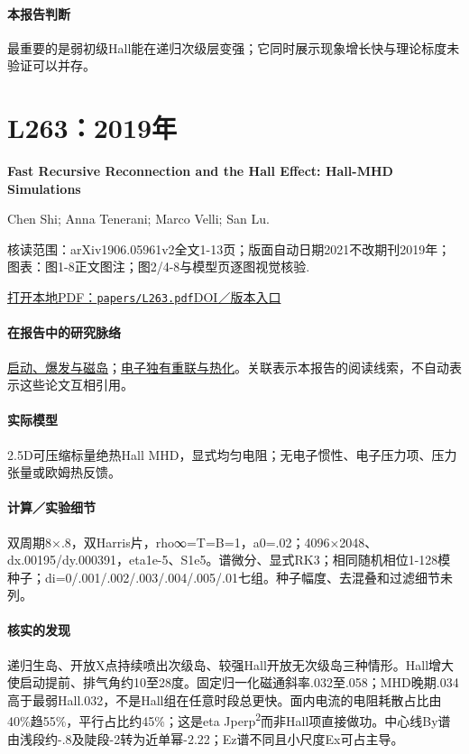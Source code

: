 \documentclass[UTF8,a4paper,11pt,openany,fontset=fandol]{ctexbook}
\begin{document}
\paragraph{本报告判断}最重要的是弱初级Hall能在递归次级层变强；它同时展示现象增长快与理论标度未验证可以并存。

\section{L263：2019年}\label{paper:L263}

\textbf{Fast Recursive Reconnection and the Hall Effect: Hall-MHD Simulations}\citep{L263}\

Chen Shi;  Anna Tenerani;  Marco Velli;  San Lu.

\textsf{核读范围：}arXiv1906.05961v2全文1-13页；版面自动日期2021不改期刊2019年；\textsf{图表：}图1-8正文图注；图2/4-8与模型页逐图视觉核验.

\href{run:../papers/L263.pdf}{打开本地PDF：\texttt{papers/L263.pdf}}\quad\href{https://doi.org/10.3847/1538-4357/ab33ff}{DOI／版本入口}

\paragraph{在报告中的研究脉络}\hyperref[story:onset]{启动、爆发与磁岛}；\hyperref[story:energy]{电子独有重联与热化}。关联表示本报告的阅读线索，不自动表示这些论文互相引用。

\paragraph{实际模型}2.5D可压缩标量绝热Hall MHD，显式均匀电阻；无电子惯性、电子压力项、压力张量或欧姆热反馈。

\paragraph{计算／实验细节}双周期8×.8，双Harris片，rho∞=T=B=1，a0=.02；4096×2048、dx.00195/dy.000391，eta1e-5、S1e5。谱微分、显式RK3；相同随机相位1-128模种子；di=0/.001/.002/.003/.004/.005/.01七组。种子幅度、去混叠和过滤细节未列。

\paragraph{核实的发现}递归生岛、开放X点持续喷出次级岛、较强Hall开放无次级岛三种情形。Hall增大使启动提前、排气角约10至28度。固定归一化磁通斜率.032至.058；MHD晚期.034高于最弱Hall.032，不是Hall组在任意时段总更快。面内电流的电阻耗散占比由40\%趋55\%，平行占比约45\%；这是eta Jperp\textsuperscript{2}而非Hall项直接做功。中心线By谱由浅段约-.8及陡段-2转为近单幂-2.22；Ez谱不同且小尺度Ex可占主导。
\end{document}
